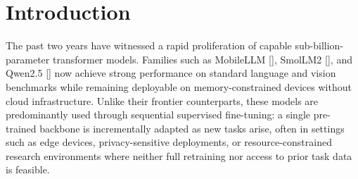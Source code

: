 \begin{abstract}
Pre-trained transformer models are typically adapted to downstream tasks via supervised fine-tuning, but sequential adaptation often leads to \textit{catastrophic forgetting}, where performance on earlier tasks degrades. Existing mitigation strategies commonly rely on data replay, architectural modifications, or heuristic regularization, limiting their scalability. We introduce \textbf{Nostalgia}, a data-free, optimization-based method for continual supervised fine-tuning that mitigates forgetting by constraining parameter updates to directions that minimally interfere with previously learned tasks. Our approach is grounded in a local quadratic approximation of task losses and operationalizes this principle through a tractable low-rank approximation of the average Hessian, enabling efficient projection-based updates compatible with modern parameter-efficient fine-tuning. Experiments across Vision and Language benchmarks demonstrate that Nostalgia consistently preserves prior-task performance without compromising adaptation to new tasks.
\end{abstract}

\section{Introduction}
\label{sec:intro}
The past two years have witnessed a rapid proliferation of capable sub-billion-parameter transformer models. Families such as MobileLLM [\cite{liu2024mobilellmoptimizingsubbillionparameter}], SmolLM2 [\cite{allal2025smollm2smolgoesbig}], and Qwen2.5 [\cite{qwen2025qwen25technicalreport}] now achieve strong performance on standard language and vision benchmarks while remaining deployable on memory-constrained devices without cloud infrastructure. Unlike their frontier counterparts, these models are predominantly used through sequential supervised fine-tuning: a single pre-trained backbone is incrementally adapted as new tasks arise, often in settings such as edge devices, privacy-sensitive deployments, or resource-constrained research environments where neither full retraining nor access to prior task data is feasible.

